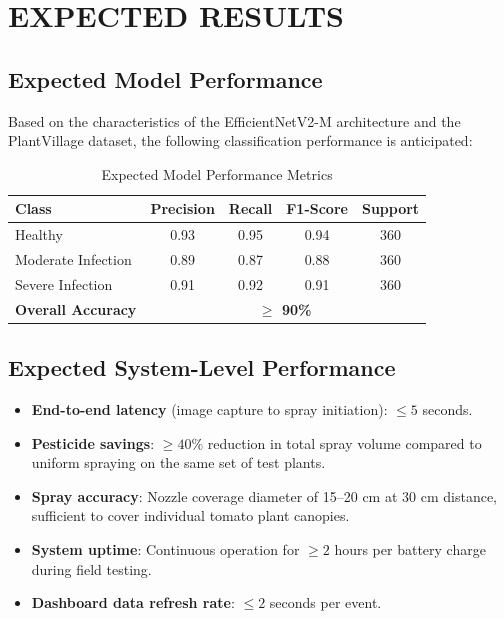 \documentclass[12pt,a4paper,oneside]{report}
\begin{document}
\chapter{EXPECTED RESULTS}

\section{Expected Model Performance}

Based on the characteristics of the EfficientNetV2-M architecture and the PlantVillage dataset, the following classification performance is anticipated:

\begin{table}[H]
\centering
\caption{Expected Model Performance Metrics}
\label{tab:expected_perf}
\renewcommand{\arraystretch}{1.3}
\begin{tabular}{|l|c|c|c|c|}
\hline
\textbf{Class} & \textbf{Precision} & \textbf{Recall} & \textbf{F1-Score} & \textbf{Support} \\
\hline
Healthy & 0.93 & 0.95 & 0.94 & 360 \\
Moderate Infection & 0.89 & 0.87 & 0.88 & 360 \\
Severe Infection & 0.91 & 0.92 & 0.91 & 360 \\
\hline
\textbf{Overall Accuracy} & \multicolumn{4}{c|}{\textbf{$\geq$ 90\%}} \\
\hline
\end{tabular}
\end{table}

\section{Expected System-Level Performance}

\begin{itemize}[leftmargin=2em]
    \item \textbf{End-to-end latency} (image capture to spray initiation): $\leq 5$ seconds.
    \item \textbf{Pesticide savings}: $\geq 40\%$ reduction in total spray volume compared to uniform spraying on the same set of test plants.
    \item \textbf{Spray accuracy}: Nozzle coverage diameter of 15--20 cm at 30 cm distance, sufficient to cover individual tomato plant canopies.
    \item \textbf{System uptime}: Continuous operation for $\geq 2$ hours per battery charge during field testing.
    \item \textbf{Dashboard data refresh rate}: $\leq 2$ seconds per event.
\end{itemize}
\end{document}
